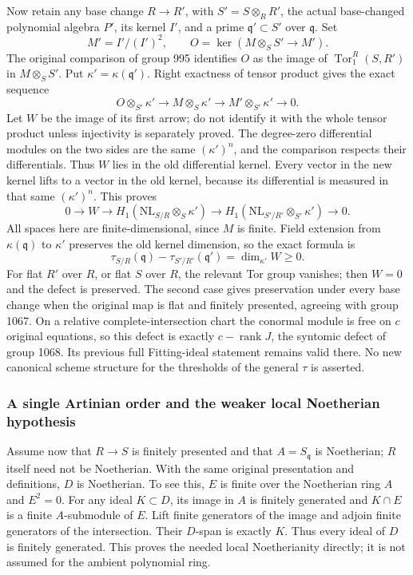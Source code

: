 Now retain any base change \(R\to R'\), with \(S'=S\otimes_RR'\), the actual base-changed polynomial algebra \(P'\), its kernel \(I'\), and a prime \(\mathfrak q'\subset S'\) over \(\mathfrak q\). Set \[
M' = I'/(I')^2,\qquad
O=\ker(M\otimes_SS'\longrightarrow M').
\] The original comparison of group 995 identifies \(O\) as the image of \(\operatorname{Tor}_1^R(S,R')\) in \(M\otimes_SS'\). Put \(\kappa'=\kappa(\mathfrak q')\). Right exactness of tensor product gives the exact sequence \[
O\otimes_{S'}\kappa'\longrightarrow
M\otimes_S\kappa'\longrightarrow M'\otimes_{S'}\kappa'\longrightarrow0.
\] Let \(W\) be the image of its first arrow; do not identify it with the whole tensor product unless injectivity is separately proved. The degree-zero differential modules on the two sides are the same \((\kappa')^n\), and the comparison respects their differentials. Thus \(W\) lies in the old differential kernel. Every vector in the new kernel lifts to a vector in the old kernel, because its differential is measured in that same \((\kappa')^n\). This proves \[
0\longrightarrow W\longrightarrow
H_1(\mathrm{NL}_{S/R}\otimes_S\kappa')
\longrightarrow
H_1(\mathrm{NL}_{S'/R'}\otimes_{S'}\kappa')
\longrightarrow0.
\] All spaces here are finite-dimensional, since \(M\) is finite. Field extension from \(\kappa(\mathfrak q)\) to \(\kappa'\) preserves the old kernel dimension, so the exact formula is \[
\tau_{S/R}(\mathfrak q)-\tau_{S'/R'}(\mathfrak q')
=\dim_{\kappa'}W\ge0.
\] For flat \(R'\) over \(R\), or flat \(S\) over \(R\), the relevant Tor group vanishes; then \(W=0\) and the defect is preserved. The second case gives preservation under every base change when the original map is flat and finitely presented, agreeing with group 1067. On a relative complete-intersection chart the conormal module is free on \(c\) original equations, so this defect is exactly \(c-\operatorname{rank}J\), the syntomic defect of group 1068. Its previous full Fitting-ideal statement remains valid there. No new canonical scheme structure for the thresholds of the general \(\tau\) is asserted.

\subsubsection{A single Artinian order and the weaker local Noetherian hypothesis}\label{a-single-artinian-order-and-the-weaker-local-noetherian-hypothesis}

Assume now that \(R\to S\) is finitely presented and that \(A=S_{\mathfrak q}\) is Noetherian; \(R\) itself need not be Noetherian. With the same original presentation and definitions, \(D\) is Noetherian. To see this, \(E\) is finite over the Noetherian ring \(A\) and \(E^2=0\). For any ideal \(K\subset D\), its image in \(A\) is finitely generated and \(K\cap E\) is a finite \(A\)-submodule of \(E\). Lift finite generators of the image and adjoin finite generators of the intersection. Their \(D\)-span is exactly \(K\). Thus every ideal of \(D\) is finitely generated. This proves the needed local Noetherianity directly; it is not assumed for the ambient polynomial ring.

